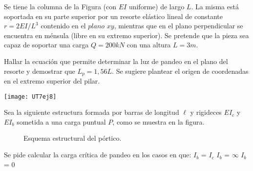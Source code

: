\ejercicio

Se tiene la columna de la Figura (con $EI$ uniforme) de largo $L$. La misma está soportada en su parte superior por un resorte elástico lineal de constante $r=2EI/L^3$ contenido en el $plano$ $xy$, mientras que en el plano perpendicular se encuentra en ménsula (libre en su extremo superior). Se pretende que la pieza sea capaz de soportar una carga $Q=200 kN$ con una altura $L=3m$.

Hallar la ecuación que permite determinar la luz de pandeo en el plano del resorte y demostrar que $L_p=1,56L$. Se sugiere plantear el origen de coordenadas en el extremo superior del pilar.

%

\begin{center}
	\texttt{[image: UT7ej8]}
\end{center}

%
%
%
%
%


\ejercicio

Sea la siguiente estructura formada por barras de longitud $\ell$ y rigideces $EI_c$ y $EI_b$ sometida a una carga puntual $P$, como se muestra en la figura.

\begin{figure}[H]
	\begin{center}
		\def\svgwidth{0.5\textwidth}
		
		\caption{Esquema estructural del pórtico.}
	\end{center}
\end{figure} 

Se pide calcular la carga crítica de pandeo en los casos en que:
\parte $I_b$ = $I_c$ 
\parte $I_b$ = $\infty$
\parte $I_b$ = 0
